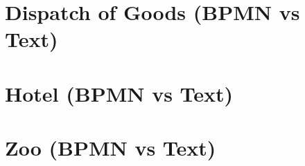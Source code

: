 %

\section{Dispatch of Goods (BPMN vs Text)}


%

\section{Hotel (BPMN vs Text)}


%

%

%

\section{Zoo (BPMN vs Text)}
\label{sec:logs-zoo}

